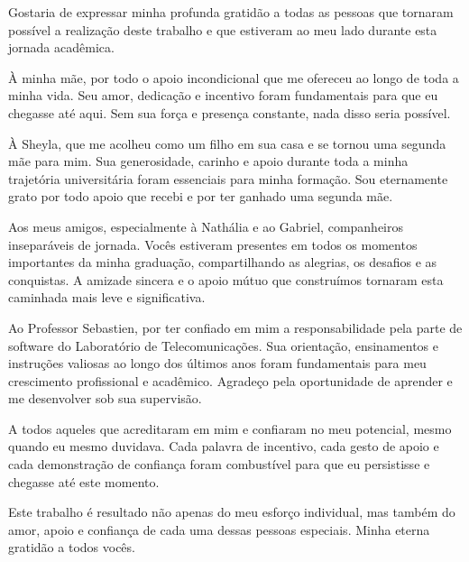 \begin{agradecimentos}
Gostaria de expressar minha profunda gratidão a todas as pessoas que tornaram possível a realização deste trabalho e que estiveram ao meu lado durante esta jornada acadêmica.

À minha mãe, por todo o apoio incondicional que me ofereceu ao longo de toda a minha vida. Seu amor, dedicação e incentivo foram fundamentais para que eu chegasse até aqui. Sem sua força e presença constante, nada disso seria possível.

À Sheyla, que me acolheu como um filho em sua casa e se tornou uma segunda mãe para mim. Sua generosidade, carinho e apoio durante toda a minha trajetória universitária foram essenciais para minha formação. Sou eternamente grato por todo apoio que recebi e por ter ganhado uma segunda mãe.

Aos meus amigos, especialmente à Nathália e ao Gabriel, companheiros inseparáveis de jornada. Vocês estiveram presentes em todos os momentos importantes da minha graduação, compartilhando as alegrias, os desafios e as conquistas. A amizade sincera e o apoio mútuo que construímos tornaram esta caminhada mais leve e significativa.

Ao Professor Sebastien, por ter confiado em mim a responsabilidade pela parte de software do Laboratório de Telecomunicações. Sua orientação, ensinamentos e instruções valiosas ao longo dos últimos anos foram fundamentais para meu crescimento profissional e acadêmico. Agradeço pela oportunidade de aprender e me desenvolver sob sua supervisão.

A todos aqueles que acreditaram em mim e confiaram no meu potencial, mesmo quando eu mesmo duvidava. Cada palavra de incentivo, cada gesto de apoio e cada demonstração de confiança foram combustível para que eu persistisse e chegasse até este momento.

Este trabalho é resultado não apenas do meu esforço individual, mas também do amor, apoio e confiança de cada uma dessas pessoas especiais. Minha eterna gratidão a todos vocês.

\end{agradecimentos}
